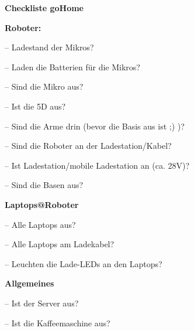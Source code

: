 \documentclass[11pt]{article}
\let\oldmarginpar\marginpar
\renewcommand\marginpar[1]{\-\oldmarginpar[\raggedleft #1]%
{\raggedright #1}}
\newenvironment{checklist}{%
  \begin{list}{}{}%
  \let\olditem\item
  \renewcommand\item{\olditem -- \marginpar{$\Box$} }
  \newcommand\checkeditem{\olditem -- \marginpar{$\CheckedBox$} }
}{%
  \end{list}
}
\begin{document}
\begin{center}
\textbf{\Huge Checkliste goHome}\\
\end{center}
\textbf{Roboter:}
\begin{checklist}
	\item Ladestand der Mikros?
	\item Laden die Batterien f\"ur die Mikros?
	\item Sind die Mikro aus?
	\item Ist die 5D aus?
	\item Sind die Arme drin (bevor die Basis aus ist ;) )?
	\item Sind die Roboter an der Ladestation/Kabel?
	\item Ist Ladestation/mobile Ladestation an (ca. 28V)?
	\item Sind die Basen aus?
\end{checklist}
\textbf{Laptops@Roboter}
\begin{checklist}
	\item Alle Laptops aus?
	\item Alle Laptops am Ladekabel?
	\item Leuchten die Lade-LEDs an den Laptops?
\end{checklist}	
\textbf{Allgemeines}
\begin{checklist}
	\item Ist der Server aus?
	\item Ist die Kaffeemaschine aus?
\end{checklist}	
\end{document}

